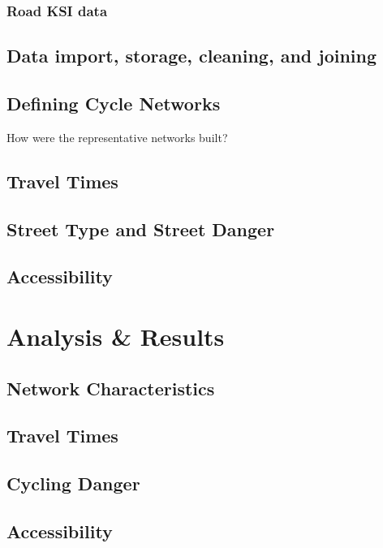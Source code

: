 \documentclass[11pt]{article} %
\begin{document}
\subsubsection{Road KSI data}

\subsection{Data import, storage, cleaning, and joining}

\subsection{Defining Cycle Networks}

How were the representative networks built? 

\subsection{Travel Times}

\subsection{Street Type and Street Danger}

\subsection{Accessibility}

\section{Analysis \& Results}

\subsection{Network Characteristics}

\subsection{Travel Times}

\subsection{Cycling Danger}

\subsection{Accessibility}
\end{document}
